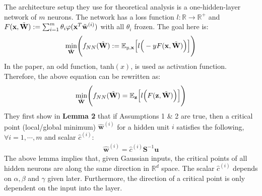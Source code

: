 \documentclass{article}
\begin{document}
The architecture setup they use for theoretical analysis is a one-hidden-layer network of $m$ neurons. The network has a loss function $l:\mathbb{R}\rightarrow{}\mathbb{R}^+$ and $F(\textbf{x},\Tilde{\textbf{W}}):=\sum_{i=1}^m\theta_i\varphi(\textbf{x}^T\Tilde{\textbf{w}}^{(i)})$ with all $\theta_i$ frozen. The goal here is:
\begin{align*}
\underset{\Tilde{\textbf{W}}}{\min}\Bigg(f_{NN}(\Tilde{\textbf{W}}):=\mathbb{E}_{y,\textbf{x}}\Big[l\Big(-yF(\textbf{x},\Tilde{\textbf{W}})\Big)\Big]\Bigg)
\end{align*}
In the paper, an odd function, $\text{tanh}(x)$, is used as activation function. Therefore, the above equation can be rewritten as:
\begin{align*}
\underset{\Tilde{\textbf{W}}}{\min}\Bigg(f_{NN}(\Tilde{\textbf{W}})=\mathbb{E}_{\textbf{z}}\Big[l\Big(F(\textbf{z},\Tilde{\textbf{W}})\Big)\Big]\Bigg)
\end{align*}
They first show in \textbf{Lemma 2} that if Assumptions 1 \& 2 are true, then a critical point (local/global minimum) $\hat{\textbf{w}}^{(i)}$ for a hidden unit $i$ satisfies the following, $\forall i=1,\cdots,m$ and scalar $\hat{c}^{(i)}$:
\begin{align*}
\hat{\textbf{w}}^{(i)}=\hat{c}^{(i)}\textbf{S}^{-1}\textbf{u}
\end{align*}
The above lemma implies that, given Gaussian inputs, the critical points of all hidden neurons are along the same direction in $\mathbb{R}^d$ space. The scalar $\hat{c}^{(i)}$ depends on $\alpha, \beta$ and $\gamma$ given later. Furthermore, the direction of a critical point is only dependent on the input into the layer. 
\end{document}
